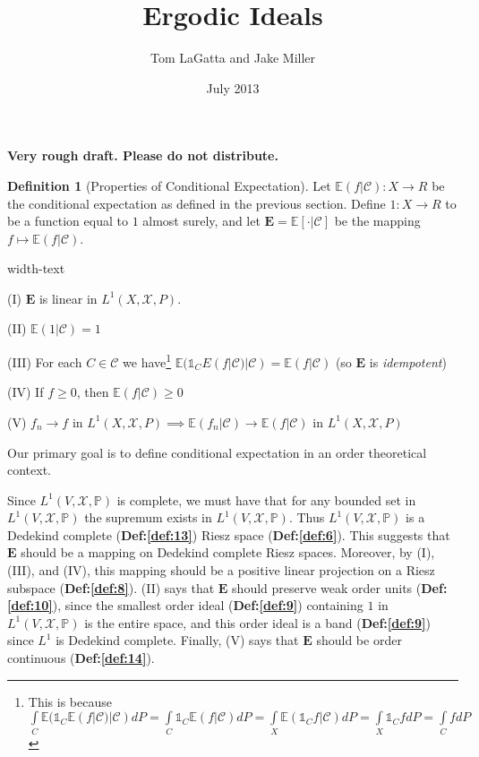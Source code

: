 \documentclass[letterpaper,10pt,oneside,onecolumn,reqno]{amsart}
\author{Tom LaGatta and Jake Miller}
\title{Ergodic Ideals}
\date{July 2013}
\newcommand{\C}{\mathcal C}
\newcommand{\E}{\mathbb E}
\renewcommand{\P}{\mathbb P}
\newcommand{\X}{\mathcal X}
\newcommand{\one}{\mathds{1}}      %
\theoremstyle{definition}
\newtheorem{defn}{Definition}
\begin{document}
\maketitle

\textbf{Very rough draft. Please do not distribute.}
\begin{defn}[Properties of Conditional Expectation]\label{def:1}
  Let $\E(f|\C) : X \to R$ be the conditional expectation as defined
  in the previous section. Define $1 : X \to R$ to be a function
  equal to $1$ almost surely, and let $\mathbf{E}=\E[\cdot|\C]$ be the
  mapping $f \mapsto \E(f|\C)$.
  \begin{deflist}{width-text}
  \item[(I)] $\mathbf{E}$ is linear in $L^1(X,\X,P)$.
  \item[(II)] $\E(1|\C) = 1$
  \item[(III)] For each $C \in \C$ we have\footnote{This is because
      $\int\limits_C\E(\one_C \E(f|\C)|\C)dP=\int\limits_C \one_C
      \E(f|\C)dP=\int\limits_X \E(\one_C f | \C)dP=\int\limits_X
      \one_C fdP=\int\limits_C fdP$ \label{fn:1}} $\E(\one_C
    E(f|\C)|\C) = \E(f|\C)$ (so $\mathbf{E}$ is \emph{idempotent})
  \item[(IV)] If $f \geq 0$, then $\E(f|\C) \geq 0$
  \item[(V)] $f_n \rightarrow f$ in $L^1(X,\X,P) \implies \E(f_n|\C)
    \rightarrow \E(f|\C)$ in $L^1(X,\X,P)$
  \end{deflist}
\end{defn}

Our primary goal is to define conditional expectation in an order
theoretical context.

\begin{framed}
  Since $L^1(V,\X,\P)$ is complete, we must have that for any bounded
  set in $L^1(V,\X,\P)$ the supremum exists in $L^1(V,\X,\P)$. Thus
  $L^1(V,\X,\P)$ is a Dedekind complete (\textbf{Def:\ref{def:13}})
  Riesz space (\textbf{Def:\ref{def:6}}). This suggests that
  $\mathbf{E}$ should be a mapping on Dedekind complete Riesz
  spaces. Moreover, by (I), (III), and (IV), this mapping should be a
  positive linear projection on a
  Riesz subspace (\textbf{Def:\ref{def:8}}). (II) says that
  $\mathbf{E}$ should preserve weak order units
  (\textbf{Def:\ref{def:10}}), since the smallest order ideal
  (\textbf{Def:\ref{def:9}}) containing $1$ in $L^1(V,\X,\P)$ is the
  entire space, and this order ideal is a band (\textbf{Def:\ref{def:9}})
  since $L^1$ is Dedekind complete. Finally, (V) says that
  $\mathbf{E}$ should be order continuous (\textbf{Def:\ref{def:14}}).
\end{framed}
\end{document}
